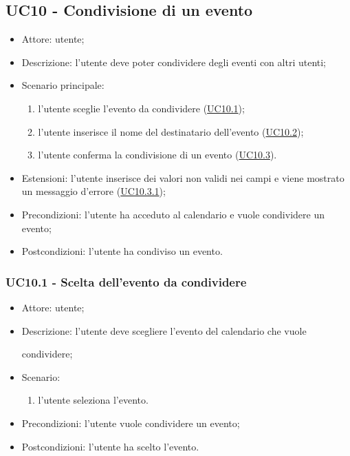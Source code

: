 \subsection{UC10 - Condivisione di un evento}
\begin{itemize}
    \item Attore: utente;
    \item Descrizione: l'utente deve poter condividere degli eventi con altri utenti;
    \item Scenario principale:
        \begin{enumerate}
        \item l'utente sceglie l'evento da condividere (\hyperref[sec: UC10.1]{UC10.1});
        \item l'utente inserisce il nome del destinatario dell'evento (\hyperref[sec: UC10.2]{UC10.2});
        \item l'utente conferma la condivisione di un evento (\hyperref[sec: UC10.3]{UC10.3}).
        \end{enumerate}
    \item Estensioni: l'utente inserisce dei valori non validi nei campi e viene mostrato un messaggio d'errore (\hyperref[sec: UC10.3.1]{UC10.3.1});
    \item Precondizioni: l'utente ha acceduto al calendario e vuole condividere un evento;
    \item Postcondizioni: l'utente ha condiviso un evento.
\end{itemize}

\subsubsection{UC10.1 - Scelta dell'evento da condividere} \label{sec: UC10.1}
\begin{itemize}
    \item Attore: utente;
    \item Descrizione: l'utente deve scegliere l'evento del calendario che vuole \par condividere;
    \item Scenario:
        \begin{enumerate}
        \item l'utente seleziona l'evento.
        \end{enumerate}
    
    \item Precondizioni: l'utente vuole condividere un evento;
    \item Postcondizioni: l'utente ha scelto l'evento.
\end{itemize}


